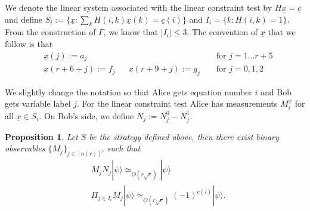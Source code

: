 \documentclass[11pt,letterpaper]{article}
\newcommand{\ket}[1]{|#1\rangle}
\newcommand{\1}{\mathbb{1}}
\newcommand{\nr}{n(r)}
\newcommand{\ux}{\underline{x}}
\newcommand{\uc}{\underline{c}}
\newcommand{\se}{\sqrt{\epsilon}}
\newcommand{\appd}[1]{\simeq_{#1}}
\newtheorem{proposition}[theorem]{Proposition}
\theoremstyle{definition}
\begin{document}
We denote the linear system associated with the linear constraint test by $H\underline{x} = \uc$ and
define $S_i := \{ \ux : \sum_{k} H(i,k)\ux(k) = \uc(i) \}$ and $I_i = \{ k : H(i,k) = 1\}$.
From the construction of $\Gamma$, we know that $| I_i| \leq 3$.
The convention of $\ux$ that we follow is that
\begin{align}
	&\ux(j) := a_j &&&&\text{ for } j = 1 \dots r+5 \\
	&\ux(r+6+j) := f_j&& \ux(r+9+j) := g_j &&\text{ for } j = 0,1,2 
\end{align} 

We slightly change the notation so that Alice gets equation number $i$ and Bob gets variable label $j$.
For the linear constraint test Alice has measurements $M_i^{\ux}$ for all $\ux \in S_i$.
On Bob's side, we define $N_j := N_j^0 - N_j^1$.
\begin{proposition}
	\label{prop:lct_base}
	Let $S$ be the strategy defined above,
	then there exist binary observables $\{ M_j \}_{j \in [\nr]}$, such that
	\begin{align}
		&M_j N_j \ket{\psi} \appd{O(r\se)} \ket{\psi} \\
		&\Pi_{j \in I_i} M_j \ket{\psi} \appd{O(r\se)}(-1)^{\uc(i)} \ket{\psi}.
	\end{align}
\end{proposition}
\end{document}
